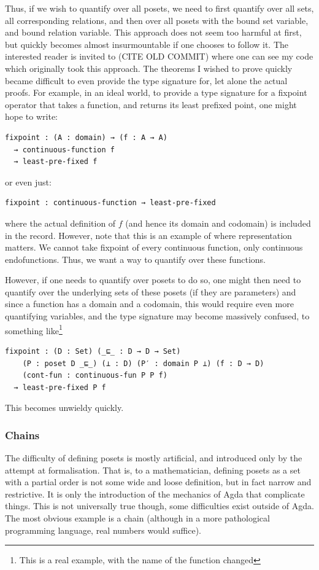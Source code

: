 \documentclass[12pt,a4paper,twoside,openright]{report}
\begin{document}
Thus, if we wish to quantify over all posets, we need to first quantify over all sets, all corresponding relations, and then over all posets with the bound set variable, and bound relation variable. This approach does not seem too harmful at first, but quickly becomes almost insurmountable if one chooses to follow it. The interested reader is invited to (CITE OLD COMMIT) where one can see my code which originally took this approach. The theorems I wished to prove quickly became difficult to even provide the type signature for, let alone the actual proofs. For example, in an ideal world, to provide a type signature for a fixpoint operator that takes a function, and returns its least prefixed point, one might hope to write:
\begin{verbatim}
fixpoint : (A : domain) → (f : A → A) 
  → continuous-function f 
  → least-pre-fixed f
\end{verbatim}
or even just:
\begin{verbatim}
fixpoint : continuous-function → least-pre-fixed
\end{verbatim}
where the actual definition of $f$ (and hence its domain and codomain) is included in the record. However, note that this is an example of where representation matters. We cannot take fixpoint of every continuous function, only continuous endofunctions. Thus, we want a way to quantify over these functions.

However, if one needs to quantify over posets to do so, one might then need to quantify over the underlying sets of these posets (if they are parameters) and since a function has a domain and a codomain, this would require even more quantifying variables, and the type signature may become massively confused, to something like\footnote{This is a real example, with the name of the function changed}
\begin{verbatim}
fixpoint : (D : Set) (_⊑_ : D → D → Set) 
    (P : poset D _⊑_) (⊥ : D) (P′ : domain P ⊥) (f : D → D) 
    (cont-fun : continuous-fun P P f) 
  → least-pre-fixed P f
\end{verbatim}

This becomes unwieldy quickly. 
\subsubsection{Chains}
The difficulty of defining posets is mostly artificial, and introduced only by the attempt at formalisation. That is, to a mathematician, defining posets as a set with a partial order is not some wide and loose definition, but in fact narrow and restrictive. It is only the introduction of the mechanics of Agda that complicate things. This is not universally true though, some difficulties exist outside of Agda. The most obvious example is a chain (although in a more pathological programming language, real numbers would suffice). 
\end{document}
